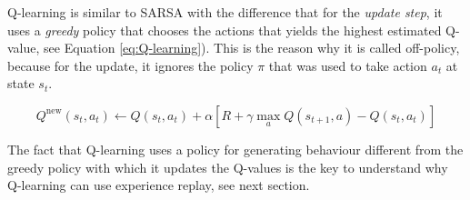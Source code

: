 Q-learning is similar to SARSA with the difference that for the \textit{update step}, it uses a \textit{greedy} policy that chooses the actions that yields the highest estimated Q-value, see Equation \eqref{eq:Q-learning}).  This is the reason why it is called off-policy, because for the update, it ignores the policy $\pi$ that was used to take action $a_t$ at state $s_t$. 



\begin{equation}
Q^{\text{new}}(s_t, a_t)  \leftarrow Q(s_t, a_t) + \alpha \left[ R  + \gamma {\max_{a} Q(s_{t+1}, a)} - Q(s_t, a_t)\right]
\label{eq:Q-learning}
\end{equation}








The fact that Q-learning uses a policy for generating behaviour different from the greedy policy with which it updates the Q-values is the key to understand why Q-learning can use experience replay, see next section.






